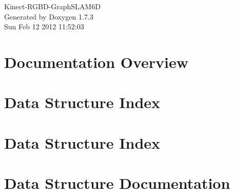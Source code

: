 \documentclass[a4paper]{book}
\begin{document}
\hypersetup{pageanchor=false}
\begin{titlepage}
\vspace*{7cm}
\begin{center}
{\Large Kinect-\/RGBD-\/GraphSLAM6D }\\
\vspace*{1cm}
{\large Generated by Doxygen 1.7.3}\\
\vspace*{0.5cm}
{\small Sun Feb 12 2012 11:52:03}\\
\end{center}
\end{titlepage}
\clearemptydoublepage
{}
\tableofcontents
\clearemptydoublepage
{}
\hypersetup{pageanchor=true}
\chapter{Documentation Overview}
\label{index}\hypertarget{index}{}
\chapter{Data Structure Index}

\chapter{Data Structure Index}

\chapter{Data Structure Documentation}


























\printindex
\end{document}
